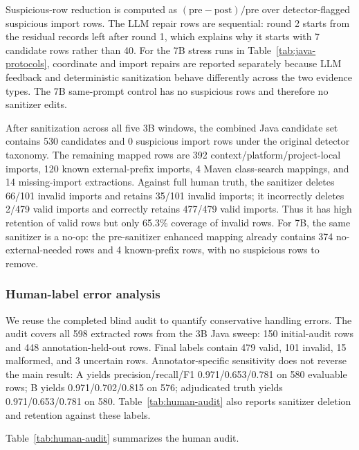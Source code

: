 \documentclass[pdflatex,sn-basic]{sn-jnl}
\begin{document}
Suspicious-row reduction is computed as \((\mathrm{pre} - \mathrm{post}) / \mathrm{pre}\) over detector-flagged suspicious import rows. The LLM repair rows are sequential: round 2 starts from the residual records left after round 1, which explains why it starts with 7 candidate rows rather than 40. For the 7B stress runs in Table~\ref{tab:java-protocols}, coordinate and import repairs are reported separately because LLM feedback and deterministic sanitization behave differently across the two evidence types. The 7B same-prompt control has no suspicious rows and therefore no sanitizer edits.

After sanitization across all five 3B windows, the combined Java candidate set contains 530 candidates and 0 suspicious import rows under the original detector taxonomy. The remaining mapped rows are 392 context/platform/project-local imports, 120 known external-prefix imports, 4 Maven class-search mappings, and 14 missing-import extractions. Against full human truth, the sanitizer deletes 66/101 invalid imports and retains 35/101 invalid imports; it incorrectly deletes 2/479 valid imports and correctly retains 477/479 valid imports. Thus it has high retention of valid rows but only 65.3\% coverage of invalid rows. For 7B, the same sanitizer is a no-op: the pre-sanitizer enhanced mapping already contains 374 no-external-needed rows and 4 known-prefix rows, with no suspicious rows to remove.

\subsubsection{Human-label error analysis}

We reuse the completed blind audit to quantify conservative handling errors. The audit covers all 598 extracted rows from the 3B Java sweep: 150 initial-audit rows and 448 annotation-held-out rows. Final labels contain 479 valid, 101 invalid, 15 malformed, and 3 uncertain rows. Annotator-specific sensitivity does not reverse the main result: A yields precision/recall/F1 0.971/0.653/0.781 on 580 evaluable rows; B yields 0.971/0.702/0.815 on 576; adjudicated truth yields 0.971/0.653/0.781 on 580. Table~\ref{tab:human-audit} also reports sanitizer deletion and retention against these labels.

Table~\ref{tab:human-audit} summarizes the human audit.
\end{document}
